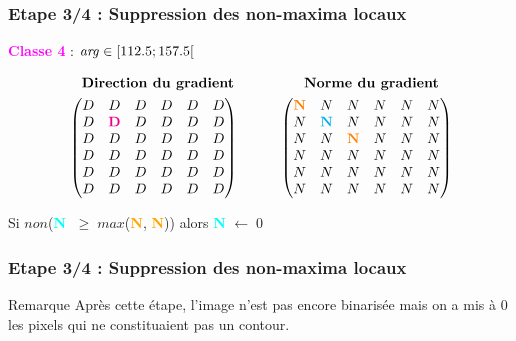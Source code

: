 \documentclass{beamer}
\begin{document}
\begin{frame}
\frametitle{Etape 3/4 : Suppression des non-maxima locaux}

\begin{center}
\textcolor{magenta}{\textbf{Classe 4}} : $ \text{\emph{arg}} \in [112.5; 157.5[ $
\end{center}

\begin{align*}
& \quad \textbf{Direction du gradient} \qquad \qquad \quad \textbf{Norme du gradient} \\
& \begin{pmatrix}
D & D & D & D & D & D \\
D & \textcolor{magenta}{\textbf{D}} & D & D & D & D \\
D & D & D & D & D & D \\
D & D & D & D & D & D \\
D & D & D & D & D & D \\
D & D & D & D & D & D \\
\end{pmatrix}
\qquad \quad
\begin{pmatrix}
\textcolor{orange}{\textbf{N}} & N & N & N & N & N \\
N & \textcolor{cyan}{\textbf{N}} & N & N & N & N \\
N & N & \textcolor{orange}{\textbf{N}} & N & N & N \\
N & N & N & N & N & N \\
N & N & N & N & N & N \\
N & N & N & N & N & N \\
\end{pmatrix}
\end{align*}

\begin{center}
Si $ non $(\textbf{\textcolor{cyan}{N}} $ \; \geq \; max $(\textbf{\textcolor{orange}{N}}, \textbf{\textcolor{orange}{N}})) alors \textbf{\textcolor{cyan}{N}} $ \leftarrow \; 0 $
\end{center}
\end{frame}

\begin{frame}
\frametitle{Etape 3/4 : Suppression des non-maxima locaux}
\begin{alertblock}{Remarque}
Après cette étape, l'image n'est pas encore binarisée mais on a mis à 0 les pixels qui ne constituaient pas un contour.
\end{alertblock}
\end{frame}
\end{document}

